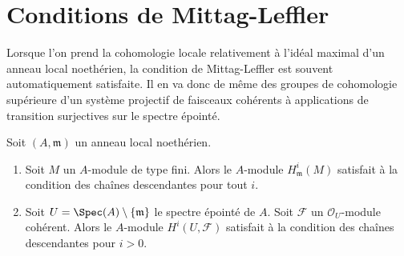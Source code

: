 \section{Conditions de Mittag-Leffler}
\label{section-ML}

\noindent
Lorsque l'on prend la cohomologie locale relativement à l'idéal maximal
d'un anneau local noethérien, la condition de Mittag-Leffler est souvent
automatiquement satisfaite. Il en va donc de même des groupes de cohomologie
supérieure d'un système projectif de faisceaux cohérents à applications de transition
surjectives sur le spectre épointé.

\begin{lemma}
\label{lemma-descending-chain}
Soit $(A, \mathfrak m)$ un anneau local noethérien.
\begin{enumerate}
\item Soit $M$ un $A$-module de type fini. Alors le $A$-module
$H^i_\mathfrak m(M)$ satisfait à la condition des chaînes descendantes
pour tout $i$.
\item Soit $U = \Spec(A) \setminus \{\mathfrak m\}$ le
spectre épointé de $A$.
Soit $\mathcal{F}$ un $\mathcal{O}_U$-module cohérent.
Alors le $A$-module $H^i(U, \mathcal{F})$
satisfait à la condition des chaînes descendantes pour $i > 0$.
\end{enumerate}
\end{lemma}

